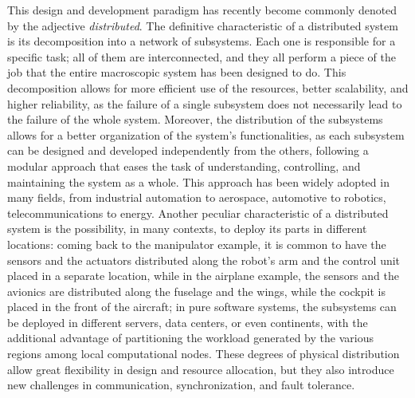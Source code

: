 This design and development paradigm has recently become commonly denoted by the adjective \emph{distributed}. The definitive characteristic of a distributed system is its decomposition into a network of subsystems. Each one is responsible for a specific task; all of them are interconnected, and they all perform a piece of the job that the entire macroscopic system has been designed to do. This decomposition allows for more efficient use of the resources, better scalability, and higher reliability, as the failure of a single subsystem does not necessarily lead to the failure of the whole system. Moreover, the distribution of the subsystems allows for a better organization of the system's functionalities, as each subsystem can be designed and developed independently from the others, following a modular approach that eases the task of understanding, controlling, and maintaining the system as a whole. This approach has been widely adopted in many fields, from industrial automation to aerospace, automotive to robotics, telecommunications to energy. Another peculiar characteristic of a distributed system is the possibility, in many contexts, to deploy its parts in different locations: coming back to the manipulator example, it is common to have the sensors and the actuators distributed along the robot's arm and the control unit placed in a separate location, while in the airplane example, the sensors and the avionics are distributed along the fuselage and the wings, while the cockpit is placed in the front of the aircraft; in pure software systems, the subsystems can be deployed in different servers, data centers, or even continents, with the additional advantage of partitioning the workload generated by the various regions among local computational nodes. These degrees of physical distribution allow great flexibility in design and resource allocation, but they also introduce new challenges in communication, synchronization, and fault tolerance.

